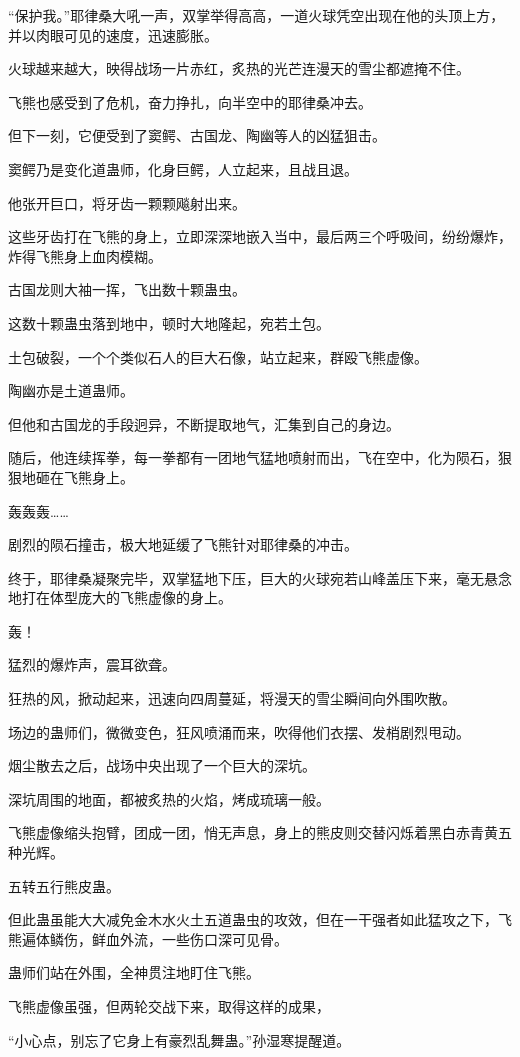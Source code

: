 \begin{this_body}
“保护我。”耶律桑大吼一声，双掌举得高高，一道火球凭空出现在他的头顶上方，并以肉眼可见的速度，迅速膨胀。

火球越来越大，映得战场一片赤红，炙热的光芒连漫天的雪尘都遮掩不住。

飞熊也感受到了危机，奋力挣扎，向半空中的耶律桑冲去。

但下一刻，它便受到了窦鳄、古国龙、陶幽等人的凶猛狙击。

窦鳄乃是变化道蛊师，化身巨鳄，人立起来，且战且退。

他张开巨口，将牙齿一颗颗飚射出来。

这些牙齿打在飞熊的身上，立即深深地嵌入当中，最后两三个呼吸间，纷纷爆炸，炸得飞熊身上血肉模糊。

古国龙则大袖一挥，飞出数十颗蛊虫。

这数十颗蛊虫落到地中，顿时大地隆起，宛若土包。

土包破裂，一个个类似石人的巨大石像，站立起来，群殴飞熊虚像。

陶幽亦是土道蛊师。

但他和古国龙的手段迥异，不断提取地气，汇集到自己的身边。

随后，他连续挥拳，每一拳都有一团地气猛地喷射而出，飞在空中，化为陨石，狠狠地砸在飞熊身上。

轰轰轰……

剧烈的陨石撞击，极大地延缓了飞熊针对耶律桑的冲击。

终于，耶律桑凝聚完毕，双掌猛地下压，巨大的火球宛若山峰盖压下来，毫无悬念地打在体型庞大的飞熊虚像的身上。

轰！

猛烈的爆炸声，震耳欲聋。

狂热的风，掀动起来，迅速向四周蔓延，将漫天的雪尘瞬间向外围吹散。

场边的蛊师们，微微变色，狂风喷涌而来，吹得他们衣摆、发梢剧烈甩动。

烟尘散去之后，战场中央出现了一个巨大的深坑。

深坑周围的地面，都被炙热的火焰，烤成琉璃一般。

飞熊虚像缩头抱臂，团成一团，悄无声息，身上的熊皮则交替闪烁着黑白赤青黄五种光辉。

五转五行熊皮蛊。

但此蛊虽能大大减免金木水火土五道蛊虫的攻效，但在一干强者如此猛攻之下，飞熊遍体鳞伤，鲜血外流，一些伤口深可见骨。

蛊师们站在外围，全神贯注地盯住飞熊。

飞熊虚像虽强，但两轮交战下来，取得这样的成果，

“小心点，别忘了它身上有豪烈乱舞蛊。”孙湿寒提醒道。


\end{this_body}
